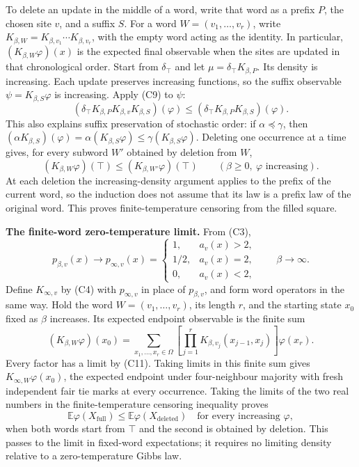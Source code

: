 \documentclass[
  11pt,
  a4paper,
]{article}
\begin{document}
To delete an update in the middle of a word, write that word as a prefix
\(P\), the chosen site \(v\), and a suffix \(S\). For a word
\(W=(v_1,\ldots,v_r)\), write
\(K_{\beta,W}=K_{\beta,v_1}\cdots K_{\beta,v_r}\), with the empty word
acting as the identity. In particular, \((K_{\beta,W}\varphi)(x)\) is
the expected final observable when the sites are updated in that
chronological order. Start from \(\delta_\top\) and let
\(\mu=\delta_\top K_{\beta,P}\). Its density is increasing. Each update
preserves increasing functions, so the suffix observable
\(\psi=K_{\beta,S}\varphi\) is increasing. Apply (C9) to \(\psi\): \[
(\delta_\top K_{\beta,P}K_{\beta,v}K_{\beta,S})(\varphi)
\leq(\delta_\top K_{\beta,P}K_{\beta,S})(\varphi).
\tag{C10}
\] This also explains suffix preservation of stochastic order: if
\(\alpha\preceq\gamma\), then
\((\alpha K_{\beta,S})(\varphi)=\alpha(K_{\beta,S}\varphi)
\leq\gamma(K_{\beta,S}\varphi)\). Deleting one occurrence at a time
gives, for every subword \(W'\) obtained by deletion from \(W\), \[
(K_{\beta,W}\varphi)(\top)\leq(K_{\beta,W'}\varphi)(\top)
\qquad(\beta\geq0,\ \varphi\text{ increasing}).
\] At each deletion the increasing-density argument applies to the
prefix of the current word, so the induction does not assume that its
law is a prefix law of the original word. This proves finite-temperature
censoring from the filled square.

\textbf{The finite-word zero-temperature limit.} From (C3), \[
p_{\beta,v}(x)\longrightarrow p_{\infty,v}(x)=
\begin{cases}
1,&a_v(x)>2,\\
1/2,&a_v(x)=2,\\
0,&a_v(x)<2,
\end{cases}
\qquad \beta\longrightarrow\infty.
\tag{C11}
\] Define \(K_{\infty,v}\) by (C4) with \(p_{\infty,v}\) in place of
\(p_{\beta,v}\), and form word operators in the same way. Hold the word
\(W=(v_1,\ldots,v_r)\), its length \(r\), and the starting state \(x_0\)
fixed as \(\beta\) increases. Its expected endpoint observable is the
finite sum \[
(K_{\beta,W}\varphi)(x_0)
=\sum_{x_1,\ldots,x_r\in\Omega}
 \left[\prod_{j=1}^r K_{\beta,v_j}(x_{j-1},x_j)\right]\varphi(x_r).
\] Every factor has a limit by (C11). Taking limits in this finite sum
gives \(K_{\infty,W}\varphi(x_0)\), the expected endpoint under
four-neighbour majority with fresh independent fair tie marks at every
occurrence. Taking the limits of the two real numbers in the
finite-temperature censoring inequality proves \[
\mathbb E\varphi(X_{\mathrm{full}})
\leq\mathbb E\varphi(X_{\mathrm{deleted}})
\quad\text{for every increasing }\varphi,
\tag{25}
\] when both words start from \(\top\) and the second is obtained by
deletion. This passes to the limit in fixed-word expectations; it
requires no limiting density relative to a zero-temperature Gibbs law.
\end{document}

